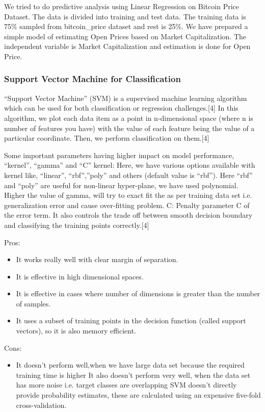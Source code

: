 \documentclass{article}
\begin{document}
We tried to do predictive analysis using Linear Regression on Bitcoin Price Dataset. The data is divided into training and test data. The training data is 75\% sampled
from bitcoin\_price dataset and rest is 25\%. We have prepared a simple model of estimating Open Prices based on Market Capitalization. The independent variable is Market Capitalization and estimation is done for Open Price.

\subsubsection {Support Vector Machine for Classification}

“Support Vector Machine” (SVM) is a supervised machine learning algorithm which can be used for both classification or regression challenges.[4] In this algorithm, we plot each data item as a point in n-dimensional space (where n is number of features you have) with the value of each feature being the value of a particular coordinate. Then, we perform classification on them.[4] \newline

Some important parameters having higher impact on model performance, “kernel”, “gamma” and “C”
kernel: Here, we have various options available with kernel like, “linear”, “rbf”,”poly” and others (default value is “rbf”).  Here “rbf” and “poly” are useful for non-linear hyper-plane, we have used polynomial. Higher the value of gamma, will try to exact fit the as per training data set i.e. generalization error and cause over-fitting problem. C: Penalty parameter C of the error term. It also controls the trade off between smooth decision boundary and classifying the training points correctly.[4] \newline

Pros:
\begin{itemize}
\item It works really well with clear margin of separation.
\item It is effective in high dimensional spaces.
\item It is effective in cases where number of dimensions is greater than the number of samples.
\item It uses a subset of training points in the decision function (called support vectors), so it is also memory efficient.
\end{itemize}
Cons:
\begin{itemize}
\item It doesn’t perform well,when we have large data set because the required training time is higher
It also doesn’t perform very well, when the data set has more noise i.e. target classes are overlapping
SVM doesn’t directly provide probability estimates, these are calculated using an expensive five-fold cross-validation. 
\end{itemize}
\end{document}
